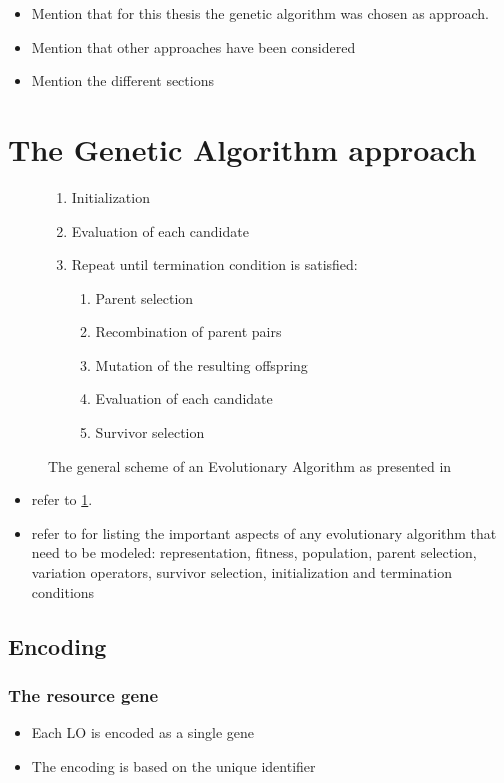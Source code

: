 \begin{itemize}
	\item Mention that for this thesis the genetic algorithm was chosen as
		approach.
	\item Mention that other approaches have been considered
	\item Mention the different sections
\end{itemize}
\section{The Genetic Algorithm approach}
\begin{figure}[ht!]
	\begin{framed}
		\begin{enumerate}
			\item Initialization
			\item Evaluation of each candidate
			\item Repeat until termination condition is satisfied:
				\begin{enumerate}
					\item Parent selection
					\item Recombination of parent pairs
					\item Mutation of the resulting offspring
					\item Evaluation of each candidate
					\item Survivor selection
				\end{enumerate}
		\end{enumerate}
	\end{framed}
	\caption[The evolutionary algorithm]{The general scheme of an
		Evolutionary Algorithm as presented in \citep{Eiben2007}}
	\label{alg:ea_scheme}
\end{figure}
\begin{itemize}
	\item refer to \ref{alg:ea_scheme}.
	\item refer to \citep{Eiben2007} for listing the important aspects of any evolutionary algorithm that need to be modeled: representation, fitness, population, parent selection, variation operators, survivor selection, initialization and termination conditions
\end{itemize}
\subsection{Encoding}
\subsubsection{The resource gene}
\begin{itemize}
	\item Each LO is encoded as a single gene
	\item The encoding is based on the unique identifier
\end{itemize}
